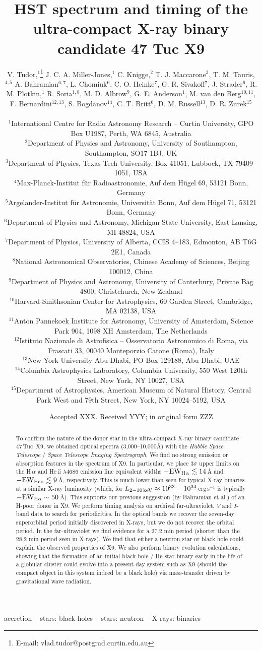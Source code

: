 \documentclass[a4paper,fleqn,usenatbib]{mnras}
\title[47 Tuc X9 -- optical spectrum and timing]{HST spectrum and timing of the ultra-compact X-ray binary candidate 47 Tuc X9}
\author[V. Tudor et al.]{V. Tudor,$^1$\thanks{E-mail: vlad.tudor@postgrad.curtin.edu.au}
J. C. A. Miller-Jones,$^{1}$
C. Knigge,$^{2}$
T. J. Maccarone$^{3}$,
T. M. Tauris,$^{4,5}$
\newauthor
A. Bahramian$^{6,7}$,
L. Chomiuk$^{6}$,
C. O. Heinke$^{7}$,
G. R. Sivakoff$^{7}$,
J. Strader$^{6}$,
\newauthor
R. M. Plotkin,$^{1}$
R. Soria$^{1,8}$,
M. D. Albrow$^{9}$,
G. E. Anderson$^{1}$,
M. van den Berg$^{10,11}$,
\newauthor
F. Bernardini$^{12,13}$,
S. Bogdanov$^{14}$,
C. T. Britt$^{6}$,
D. M. Russell$^{13}$,
D. R. Zurek$^{15}$
\\
\\
$^{1}$International Centre for Radio Astronomy Research -- Curtin University, GPO Box U1987, Perth, WA 6845, Australia
\\
$^{2}$Department of Physics and Astronomy, University of Southampton, Southampton, SO17 1BJ, UK
\\
$^{3}$Department of Physics, Texas Tech University, Box 41051, Lubbock, TX 79409--1051, USA
\\
$^{4}$Max-Planck-Institut f\"{u}r Radioastronomie, Auf dem H\"{u}gel 69, 53121 Bonn, Germany
\\
$^{5}$Argelander-Institut f\"{u}r Astronomie, Universit\"{a}t Bonn, Auf dem H\"{u}gel 71, 53121 Bonn, Germany
\\
$^{6}$Department of Physics and Astronomy, Michigan State University, East Lansing, MI 48824, USA
\\
$^{7}$Department of Physics, University of Alberta, CCIS 4--183, Edmonton, AB T6G 2E1, Canada
\\
$^{8}$National Astronomical Observatories, Chinese Academy of Sciences, Beijing 100012, China
\\
$^{9}$Department of Physics and Astronomy, University of Canterbury, Private Bag 4800, Christchurch, New Zealand
\\
$^{10}$Harvard-Smithsonian Center for Astrophysics, 60 Garden Street, Cambridge, MA 02138, USA
\\
$^{11}$Anton Pannekoek Institute for Astronomy, University of Amsterdam, Science Park 904, 1098 XH Amsterdam, The Netherlands
\\
$^{12}$Istituto Nazionale di Astrofisica -- Osservatorio Astronomico di Roma, via Frascati 33, 00040 Monteporzio Catone (Roma), Italy
\\
$^{13}$New York University Abu Dhabi, PO Box 129188, Abu Dhabi, UAE
\\
$^{14}$Columbia Astrophysics Laboratory, Columbia University, 550 West 120th Street, New York, NY 10027, USA
\\
$^{15}$Department of Astrophysics, American Museum of Natural History, Central Park West and 79th Street, New York, NY 10024--5192, USA
}
\date{Accepted XXX. Received YYY; in original form ZZZ}
\begin{document}
\label{firstpage}
\pagerange{\pageref{firstpage}--\pageref{lastpage}}
\maketitle


\begin{abstract}
To confirm the nature of the donor star in the ultra-compact X-ray binary candidate 47\,Tuc~X9, we obtained optical spectra (3,000--10,000{\AA}) with the {\it Hubble Space Telescope} / {\it Space Telescope Imaging Spectrograph}. We find no strong emission or absorption features in the spectrum of X9. In particular, we place $3\sigma$ upper limits on the H\,$\alpha$ and He\,{\sc ii} $\lambda 4686$ emission line equivalent widths $\rm -EW_{\rm H \alpha} \lesssim 14$\,{\AA} and $\rm -EW_{He \textsc{ii}} \lesssim 9$\,{\AA}, respectively. This is much lower than seen for typical X-ray binaries at a similar X-ray luminosity (which, for $L_{\rm 2-10\,keV} \approx 10^{33}-10^{34}$\,erg\,s$^{-1}$ is typically $\rm -EW_{\rm H \alpha} \sim 50$\,{\AA}). This supports our previous suggestion (by Bahramian et al.) of an H-poor donor in X9. We perform timing analysis on archival far-ultraviolet, $V$ and $I$-band data to search for periodicities. In the optical bands we recover the seven-day superorbital period initially discovered in X-rays, but we do not recover the orbital period. In the far-ultraviolet we find evidence for a 27.2 min period (shorter than the 28.2 min period seen in X-rays). We find that either a neutron star or black hole could explain the observed properties of X9. We also perform binary evolution calculations, showing that the formation of an initial black hole / He-star binary early in the life of a globular cluster could evolve into a present-day system such as X9 (should the compact object in this system indeed be a black hole) via mass-transfer driven by gravitational wave radiation.
\end{abstract}

\begin{keywords}
accretion -- stars: black holes -- stars: neutron -- X-rays: binaries
\end{keywords}


\end{document}
